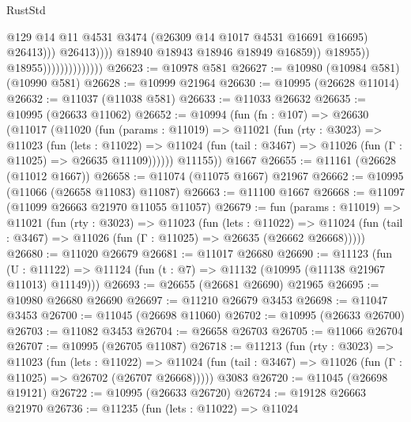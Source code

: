 \begin{lexlean}{RustStd}
\begin{coremodule}
                                                      @129
                                                      @14
                                                      @11
                                                      @4531
                                                      @3474
                                                      (@26309 @14 @1017 @4531 @16691 @16695)
                                                      @26413)))
                                                @26413))))
                                        @18940
                                        @18943
                                        @18946
                                        @18949
                                        @16859))
                                    @18955))
                                @18955))))))))))))))
@26623 := @10978 @581
@26627 := @10980 (@10984 @581) (@10990 @581)
@26628 := @10999 @21964
@26630 := @10995 (@26628 @11014)
@26632 := @11037 (@11038 @581)
@26633 := @11033 @26632
@26635 := @10995 (@26633 @11062)
@26652 := @10994
    (fun (fn : @107) =>
    @26630
      (@11017
        (@11020
          (fun (params : @11019) =>
          @11021
            (fun (rty : @3023) =>
            @11023
              (fun (lets : @11022) =>
              @11024 (fun (tail : @3467) => @11026 (fun (Γ : @11025) => @26635 @11109))))))
        @11155))
    @1667
@26655 := @11161 (@26628 (@11012 @1667))
@26658 := @11074 (@11075 @1667) @21967
@26662 := @10995 (@11066 (@26658 @11083) @11087)
@26663 := @11100 @1667
@26668 := @11097 (@11099 @26663 @21970 @11055 @11057)
@26679 := fun (params : @11019) =>
  @11021
    (fun (rty : @3023) =>
    @11023
      (fun (lets : @11022) =>
      @11024 (fun (tail : @3467) => @11026 (fun (Γ : @11025) => @26635 (@26662 @26668)))))
@26680 := @11020 @26679
@26681 := @11017 @26680
@26690 := @11123
    (fun (U : @11122) => @11124 (fun (t : @7) => @11132 (@10995 (@11138 @21967 @11013) @11149)))
@26693 := @26655 (@26681 @26690) @21965
@26695 := @10980 @26680 @26690
@26697 := @11210 @26679 @3453
@26698 := @11047 @3453
@26700 := @11045 (@26698 @11060)
@26702 := @10995 (@26633 @26700)
@26703 := @11082 @3453
@26704 := @26658 @26703
@26705 := @11066 @26704
@26707 := @10995 (@26705 @11087)
@26718 := @11213
    (fun (rty : @3023) =>
    @11023
      (fun (lets : @11022) =>
      @11024 (fun (tail : @3467) => @11026 (fun (Γ : @11025) => @26702 (@26707 @26668)))))
    @3083
@26720 := @11045 (@26698 @19121)
@26722 := @10995 (@26633 @26720)
@26724 := @19128 @26663 @21970
@26736 := @11235
    (fun (lets : @11022) =>
    @11024

\end{coremodule}
\end{lexlean}
